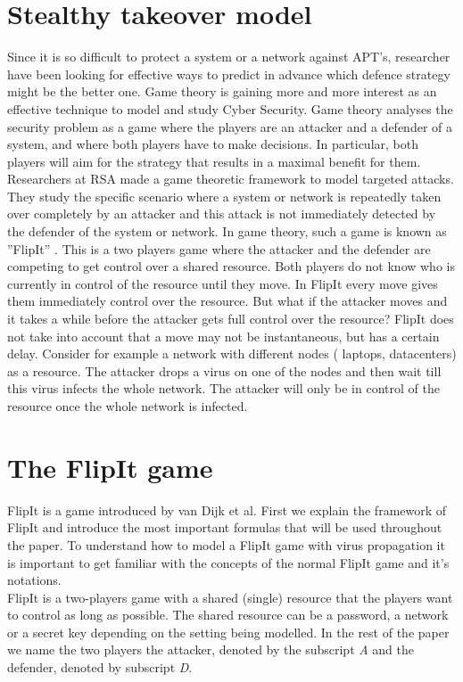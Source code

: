 \documentclass[journal,a4paper]{IEEEtran}
\begin{document}
\section{Stealthy takeover model}
Since it is so difficult to protect a system or a network against APT's, researcher have been looking for effective ways to predict in advance which defence strategy might be the better one. 
Game theory is gaining more and more interest as an effective technique to  model and study Cyber Security. Game theory analyses the security problem as a game where the players are an attacker and a defender of a system, and where both players have to make decisions. In particular, both players will aim for the strategy that results in a maximal benefit for them.  Researchers at RSA made a game theoretic framework to model targeted attacks. They study the specific scenario where a system or network is repeatedly taken over completely by an attacker and this attack is not immediately detected by the defender of the system or network. In game theory, such a game is known as ''FlipIt'' \cite{FlipIt}. This is a two players game where the attacker and the defender are competing to get control over a shared resource. Both players do not know who is currently in control of the resource until they move. In FlipIt every move gives them immediately control over the resource. But what if the attacker moves and it takes a while before the attacker gets full control over the resource? FlipIt does not take into account that a move may not be instantaneous, but has a certain delay. Consider for example a network with different nodes ( laptops, datacenters) as a resource. The attacker drops a virus on one of the nodes and then wait till this virus infects the whole network. The attacker will only be in control of the resource once the whole network is infected. \\

\section{The FlipIt game}
\label{ch:FlipItGame}
FlipIt is a game introduced by van Dijk et al. First we explain the framework of FlipIt and introduce the most important formulas that will be used throughout the paper. To understand how to model a FlipIt game with virus propagation it is important to get familiar with the concepts of the normal FlipIt game and it's notations.  \\

FlipIt is a two-players game with a shared (single) resource that the players want to control as long as possible. The shared resource can be a password, a network or a secret key depending on the setting being modelled. In the rest of the paper we name the two players the attacker, denoted by the subscript \textit{A} and the defender, denoted by subscript \textit{D}. 
\end{document}
